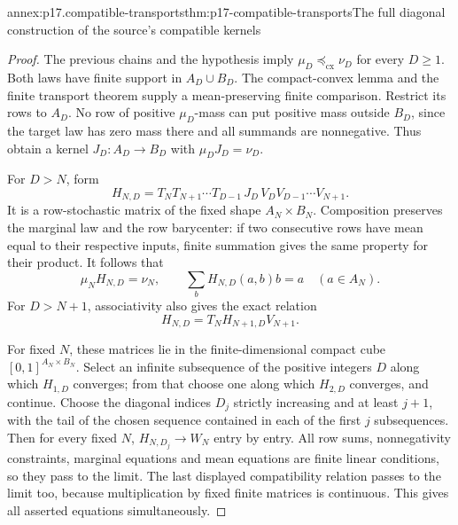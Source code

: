 \begin{annexitem}{annex:p17.compatible-transports}{thm:p17-compatible-transports}{The full diagonal construction of the source's compatible kernels}
\begin{proof}
The previous chains and the hypothesis imply
\(\mu_D\preceq_{\mathrm{cx}}\nu_D\) for every \(D\geq1\).
Both laws have finite support in \(A_D\cup B_D\).
The compact-convex lemma and the finite transport theorem supply a
mean-preserving finite comparison. Restrict its rows to \(A_D\).
No row of positive \(\mu_D\)-mass can put positive mass outside \(B_D\),
since the target law has zero mass there and all summands are
nonnegative. Thus obtain a kernel \(J_D:A_D\to B_D\) with
\(\mu_DJ_D=\nu_D\).

For \(D>N\), form
\[
 H_{N,D}=T_NT_{N+1}\cdots T_{D-1}\,
               J_D\,V_DV_{D-1}\cdots V_{N+1}.
\]
It is a row-stochastic matrix of the fixed shape \(A_N\times B_N\).
Composition preserves the marginal law and the row barycenter:
if two consecutive rows have mean equal to their respective inputs,
finite summation gives the same property for their product.
It follows that
\[
             \mu_NH_{N,D}=\nu_N,\qquad
             \sum_bH_{N,D}(a,b)b=a
                                         \quad(a\in A_N).
\]
For \(D>N+1\), associativity also gives the exact relation
\[
                         H_{N,D}=T_NH_{N+1,D}V_{N+1}.
\]

For fixed \(N\), these matrices lie in the finite-dimensional compact
cube \([0,1]^{A_N\times B_N}\).
Select an infinite subsequence of the positive integers \(D\)
along which \(H_{1,D}\) converges; from that choose one along
which \(H_{2,D}\) converges, and continue. Choose the diagonal
indices \(D_j\) strictly increasing and at least \(j+1\), with the
tail of the chosen sequence contained in each of the first \(j\)
subsequences. Then for every fixed \(N\),
\(H_{N,D_j}\to W_N\) entry by entry.
All row sums, nonnegativity constraints, marginal equations and
mean equations are finite linear conditions, so they pass to the limit.
The last displayed compatibility relation passes to the limit too,
because multiplication by fixed finite matrices is continuous.
This gives all asserted equations simultaneously.
\end{proof}
\end{annexitem}

